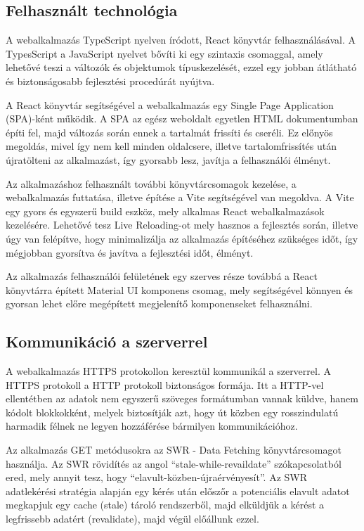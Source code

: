 \subsection{Felhasznált technológia}

A webalkalmazás TypeScript\cite{typescriptdocs} nyelven íródott, React\cite{reactdocs} könyvtár felhasználásával.
A TypesScript a JavaScript\cite{javascriptdocsmozilla} nyelvet bővíti ki egy szintaxis csomaggal, amely lehetővé teszi a változók és objektumok típuskezelését, ezzel egy jobban átlátható és biztonságosabb fejlesztési procedúrát nyújtva.

A React könyvtár segítségével a webalkalmazás egy Single Page Application (SPA)-ként\cite{singlepageapplicationdocs} működik.
A SPA az egész weboldalt egyetlen HTML dokumentumban építi fel, majd változás során ennek a tartalmát frissíti és cseréli. Ez előnyös megoldás, mivel így nem kell minden oldalcsere, illetve tartalomfrissítés után újratölteni az alkalmazást, így gyorsabb lesz, javítja a felhasználói élményt.

Az alkalmazáshoz felhasznált további könyvtárcsomagok kezelése, a webalkalmazás futtatása, illetve építése a Vite\cite{vitedocs} segítségével van megoldva.
A Vite egy gyors és egyszerű build eszköz, mely alkalmas React webalkalmazások kezelésére. Lehetővé tesz Live Reloading-ot mely hasznos a fejlesztés során, illetve úgy van felépítve, hogy minimalizálja az alkalmazás építéséhez szükséges időt, így mégjobban gyorsítva és javítva a fejlesztési időt, élményt.

Az alkalmazás felhasználói felületének egy szerves része továbbá a React könyvtárra épített Material UI komponens csomag, mely segítségével könnyen és gyorsan lehet előre megépített megjelenítő komponenseket felhasználni.

\subsection{Kommunikáció a szerverrel}

A webalkalmazás HTTPS protokollon keresztül kommunikál a szerverrel. A HTTPS protokoll a HTTP protokoll biztonságos formája. Itt a HTTP-vel ellentétben az adatok nem egyszerű szöveges formátumban vannak küldve, hanem kódolt blokkokként, melyek biztosítják azt, hogy út közben egy rosszindulatú harmadik félnek ne legyen hozzáférése bármilyen kommunikációhoz.

Az alkalmazás GET metódusokra az SWR - Data Fetching\cite{swrdocs} könyvtárcsomagot használja. Az SWR rövidítés az angol ``stale-while-revaildate'' szókapcsolatból ered, mely annyit tesz, hogy ``elavult-közben-újraérvényesít''. Az SWR adatlekérési stratégia alapján egy kérés után előszőr a potenciális elavult adatot megkapjuk egy cache (stale) tároló rendszerből, majd elküldjük a kérést a legfrissebb adatért (revalidate), majd végül előállunk ezzel.

